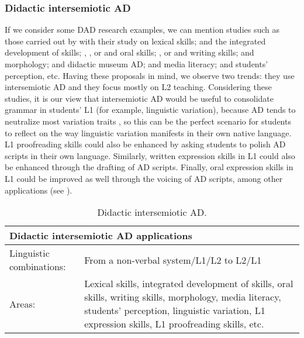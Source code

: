 \documentclass[english]{textolivre}
\begin{document}
\subsubsection{Didactic intersemiotic AD}\label{sec-organizacao}
If we consider some DAD research examples, we can mention studies such as those carried out by \textcite{ibanez-moreno2013} with their study on lexical skills; \textcite{ibanez-moreno2017} and the integrated development of skills; \textcite{navarrete2018}, \textcite{talavan_lertola2016}, or \textcite{navarrete2024} and oral skills; \textcite{calduch2018}, or \textcite{talavan_lertola_ibanez2022} and writing skills; \textcite{schaeffer-lacroix2020} and morphology; \textcite{bartolini2024} and didactic museum AD; \textcite{herrero2018} and media literacy; \textcite{bausells-espin2022} and students’ perception, etc. Having these proposals in mind, we observe two trends: they use intersemiotic AD and they focus mostly on L2 teaching. Considering these studies, it is our view that intersemiotic AD would be useful to consolidate grammar in students’ L1 (for example, linguistic variation), because AD tends to neutralize most variation traits \cite{romero2025linguistic}, so this can be the perfect scenario for students to reflect on the way linguistic variation manifests in their own native language. L1 proofreading skills could also be enhanced by asking students to polish AD scripts in their own language. Similarly, written expression skills in L1 could also be enhanced through the drafting of AD scripts. Finally, oral expression skills in L1 could be improved as well through the voicing of AD scripts, among other applications (see ).

\begin{table}[htbp]
\centering
\begin{threeparttable}
\caption{Didactic intersemiotic AD.}
\label{tbl2}
\begin{tabular}{p{4cm} p{10cm}}
\toprule
\multicolumn{2}{l}{Didactic intersemiotic AD applications} \\ 
\midrule
Linguistic combinations: & From a non-verbal system/L1/L2 to L2/L1   \\ 
Areas: & Lexical skills, integrated development of skills, oral skills, writing skills, morphology, media literacy, students’ perception, linguistic variation, L1 expression skills, L1 proofreading skills, etc.    \\ 
\bottomrule
\end{tabular}
\end{threeparttable}
\end{table}
\end{document}
